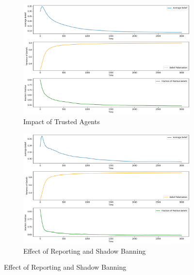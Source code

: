 \documentclass[a4paper,11pt]{scrartcl}
\begin{document}
\begin{figure}[!h]
    \begin{subfigure}[b]{0.45\textwidth}
        \centering
        \includegraphics[width=\textwidth]{./images/task4_2.png}
        \caption{Impact of Trusted Agents}
        \label{fig:task4_2}
    \end{subfigure}
     \hfill 
    \begin{subfigure}[b]{0.45\textwidth}
        \centering
        \includegraphics[width=\textwidth]{./images/task4_3.png}
        \caption{Effect of Reporting and Shadow Banning}
        \label{fig:task4_3}
    \end{subfigure}
    
    \vspace{0.5cm}


\end{figure}
\end{document}
